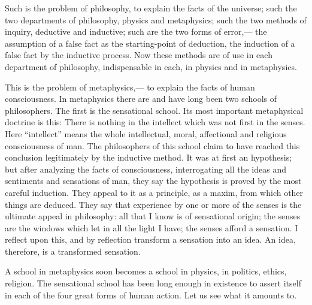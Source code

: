 \documentclass[12pt]{article}
\begin{document}
Such is the problem of philosophy, to explain the facts of the universe; such the two departments of philosophy, physics and metaphysics; such the two methods of inquiry, deductive and inductive; such are the two forms of error,--- the assumption of a false fact as the starting-point of deduction, the induction of a false fact by the inductive process. Now these methods are of use in each department of philosophy, indispensable in each, in physics and in metaphysics. 


This is the problem of metaphysics,--- to explain the facts of human consciousness. In metaphysics there are and have long been two schools of philosophers. The first is the sensational school. Its most important metaphysical doctrine is this: There is nothing in the intellect which was not first in the senses. Here ``intellect'' means the whole intellectual, moral, affectional and religious consciousness of man. The philosophers of this school claim to have reached this conclusion legitimately by the inductive method. It was at first an hypothesis; but after analyzing the facts of consciousness, interrogating all the ideas and sentiments and sensations of man, they say the hypothesis is proved by the most careful induction. They appeal to it as a principle, as a maxim, from which other things are deduced. They say that experience by one or more of the senses is the ultimate appeal in philosophy: all that I know is of sensational origin; the senses are the windows which let in all the light I have; the senses afford a sensation. I reflect upon this, and by reflection transform a sensation into an idea. An idea, therefore, is a transformed sensation. 

A school in metaphysics soon becomes a school in physics, in politics, ethics, religion. The sensational school has been long enough in existence to assert itself in each of the four great forms of human action. Let us see what it amounts to. 
\end{document}
